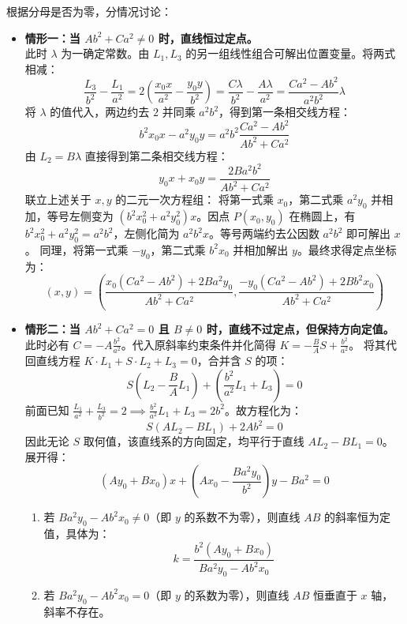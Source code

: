 \begin{solution}
根据分母是否为零，分情况讨论：
\begin{itemize}
\item \textbf{情形一：当 $A b^2 + C a^2 \neq 0$ 时，直线恒过定点。}\\
此时 $\lambda$ 为一确定常数。由 $L_1, L_3$ 的另一组线性组合可解出位置变量。将两式相减：
\[ \frac{L_3}{b^2} - \frac{L_1}{a^2} = 2 \left( \frac{x_0 x}{a^2} - \frac{y_0 y}{b^2} \right) = \frac{C\lambda}{b^2} - \frac{A\lambda}{a^2} = \frac{C a^2 - A b^2}{a^2 b^2} \lambda \]
将 $\lambda$ 的值代入，两边约去 $2$ 并同乘 $a^2 b^2$，得到第一条相交线方程：
\[ b^2 x_0 x - a^2 y_0 y = a^2 b^2 \frac{C a^2 - A b^2}{A b^2 + C a^2} \]
由 $L_2 = B\lambda$ 直接得到第二条相交线方程：
\[ y_0 x + x_0 y = \frac{2 B a^2 b^2}{A b^2 + C a^2} \]
联立上述关于 $x, y$ 的二元一次方程组：
将第一式乘 $x_0$，第二式乘 $a^2 y_0$ 并相加，等号左侧变为 $(b^2 x_0^2 + a^2 y_0^2)x$。因点 $P(x_0,y_0)$ 在椭圆上，有 $b^2 x_0^2 + a^2 y_0^2 = a^2 b^2$，左侧化简为 $a^2 b^2 x$。等号两端约去公因数 $a^2 b^2$ 即可解出 $x$。
同理，将第一式乘 $-y_0$，第二式乘 $b^2 x_0$ 并相加解出 $y$。最终求得定点坐标为：
\[ (x, y) = \left( \frac{x_0 (C a^2 - A b^2) + 2 B a^2 y_0}{A b^2 + C a^2}, \frac{-y_0 (C a^2 - A b^2) + 2 B b^2 x_0}{A b^2 + C a^2} \right) \]

\item \textbf{情形二：当 $A b^2 + C a^2 = 0$ 且 $B \neq 0$ 时，直线不过定点，但保持方向定值。}\\
此时必有 $C = -A \frac{b^2}{a^2}$。代入原斜率约束条件并化简得 $K = -\frac{B}{A} S + \frac{b^2}{a^2}$。
将其代回直线方程 $K \cdot L_1 + S \cdot L_2 + L_3 = 0$，合并含 $S$ 的项：
\[ S \left( L_2 - \frac{B}{A} L_1 \right) + \left( \frac{b^2}{a^2} L_1 + L_3 \right) = 0 \]
前面已知 $\frac{L_1}{a^2} + \frac{L_3}{b^2} = 2 \implies \frac{b^2}{a^2} L_1 + L_3 = 2b^2$。故方程化为：
\[ S(A L_2 - B L_1) + 2 A b^2 = 0 \]
因此无论 $S$ 取何值，该直线系的方向固定，均平行于直线 $A L_2 - B L_1 = 0$。展开得：
\[ (A y_0 + B x_0) x + \left(A x_0 - \frac{B a^2 y_0}{b^2}\right) y - B a^2 = 0 \]
\begin{enumerate}
    \item[(1)] 若 $B a^2 y_0 - A b^2 x_0 \neq 0$（即 $y$ 的系数不为零），则直线 $AB$ 的斜率恒为定值，具体为：
    \[ k = \frac{b^2 (A y_0 + B x_0)}{B a^2 y_0 - A b^2 x_0} \]
    \item[(2)] 若 $B a^2 y_0 - A b^2 x_0 = 0$（即 $y$ 的系数为零），则直线 $AB$ 恒垂直于 $x$ 轴，斜率不存在。
\end{enumerate}
\end{itemize}


\end{solution}
